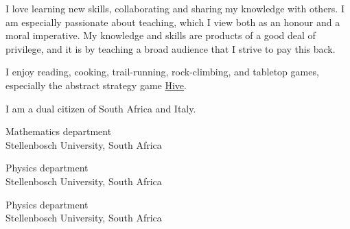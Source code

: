\documentclass[10pt,a4paper,ragged2e,withhyper]{altacv}
\begin{document}
\begin{paracol}{2}
\medskip

I love learning new skills, collaborating and sharing my knowledge with others.
I am especially passionate about teaching, which I view both as an honour and a moral imperative.
My knowledge and skills are products of a good deal of privilege, and it is by teaching a broad audience that I
strive to pay this back.

\medskip

I enjoy reading, cooking, trail-running, rock-climbing, and tabletop games, especially the abstract strategy game
\href{https://github.com/dariotrinchero/hive}{Hive}.

\medskip

I am a dual citizen of South Africa and Italy.

\smallskip


\smallskip

{Mathematics department\\Stellenbosch University, South Africa}

\divider

{Physics department\\Stellenbosch University, South Africa}

\divider

{Physics department\\Stellenbosch University, South Africa}



\end{paracol}
\end{document}
